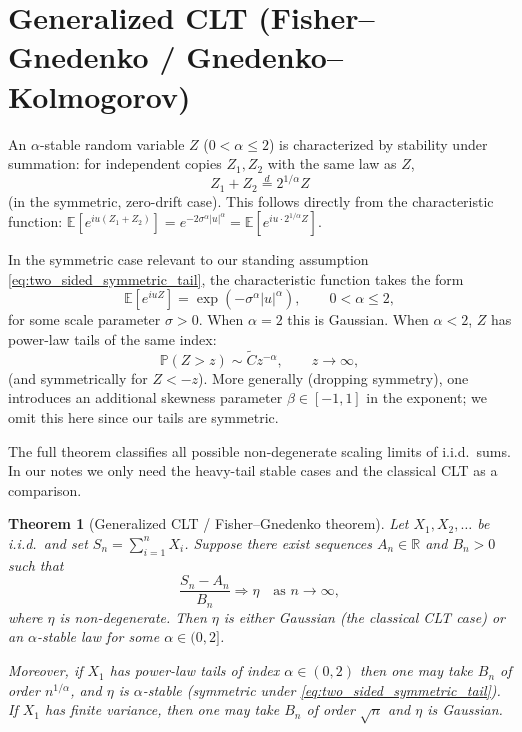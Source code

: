 \documentclass[11pt]{article}
\newtheorem{theorem}{Theorem}
\begin{document}
\section{Generalized CLT (Fisher--Gnedenko / Gnedenko--Kolmogorov)}\label{sec:gclt_statement}

An $\alpha$-stable random variable $Z$ ($0<\alpha\le 2$) is characterized by stability under summation: for independent copies $Z_1,Z_2$ with the same law as $Z$,
\begin{equation}\label{eq:stability_property}
Z_1+Z_2 \stackrel{d}{=} 2^{1/\alpha} Z
\end{equation}
(in the symmetric, zero-drift case). This follows directly from the characteristic function: ${\mathbb E}[e^{iu(Z_1+Z_2)}] = e^{-2\sigma^\alpha|u|^\alpha} = {\mathbb E}[e^{iu\cdot 2^{1/\alpha}Z}]$.

In the symmetric case relevant to our standing assumption \eqref{eq:two_sided_symmetric_tail}, the characteristic function takes the form
\begin{equation}\label{eq:symmetric_stable_cf}
{\mathbb E}\!\left[e^{iuZ}\right] = \exp\!\left(-\sigma^\alpha |u|^\alpha\right),
\qquad 0<\alpha\le 2,
\end{equation}
for some scale parameter $\sigma>0$. When $\alpha=2$ this is Gaussian. When $\alpha<2$, $Z$ has power-law tails of the same index:
\begin{equation}\label{eq:stable_tail_again}
{\mathbb P}(Z>z)\sim \widetilde C z^{-\alpha},
\qquad z\to\infty,
\end{equation}
(and symmetrically for $Z<-z$).
More generally (dropping symmetry), one introduces an additional skewness parameter $\beta\in[-1,1]$ in the exponent; we omit this here since our tails are symmetric.


The full theorem classifies all possible non-degenerate scaling limits of i.i.d.\ sums. In our notes we only need the heavy-tail stable cases and the classical CLT as a comparison.

\begin{theorem}[Generalized CLT / Fisher--Gnedenko theorem]\label{thm:gclt}
Let $X_1,X_2,\dots$ be i.i.d.\ and set $S_n=\sum_{i=1}^n X_i$. Suppose there exist sequences $A_n\in\mathbb R$ and $B_n>0$ such that
\begin{equation}\label{eq:gclt_conv}
\frac{S_n-A_n}{B_n}\Rightarrow \eta
\quad \text{as } n\to\infty,
\end{equation}
where $\eta$ is non-degenerate. Then $\eta$ is either Gaussian (the classical CLT case) or an $\alpha$-stable law for some $\alpha\in(0,2]$.

Moreover, if $X_1$ has power-law tails of index $\alpha\in(0,2)$ then one may take $B_n$ of order $n^{1/\alpha}$, and $\eta$ is $\alpha$-stable (symmetric under \eqref{eq:two_sided_symmetric_tail}). If $X_1$ has finite variance, then one may take $B_n$ of order $\sqrt{n}$ and $\eta$ is Gaussian.
\end{theorem}
\end{document}
